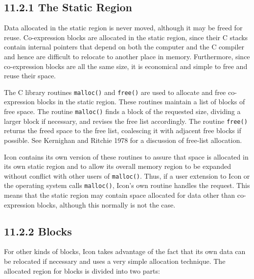 \subsection[11.2.1 The Static Region]{11.2.1 The Static Region}

Data allocated in the static region is never moved, although it may be
freed for reuse. Co-expression blocks are allocated in the static
region, since their C stacks contain internal pointers that depend on
both the computer and the C compiler and hence are difficult to
relocate to another place in memory. Furthermore, since co-expression
blocks are all the same size, it is economical and simple to free and
reuse their space.

The C library routines \texttt{malloc()} and \texttt{free()} are used
to allocate and free co-expression blocks in the static region. These
routines maintain a list of blocks of free space. The routine
\texttt{malloc()} finds a block of the requested size, dividing a
larger block if necessary, and revises the free list accordingly. The
routine \texttt{free()} returns the freed space to the free list,
coalescing it with adjacent free blocks if possible. See Kernighan and
Ritchie 1978 for a discussion of free-list allocation.

Icon contains its own version of these routines to assure that space
is allocated in its own static region and to allow its overall memory
region to be expanded without conflict with other users of
\texttt{malloc()}. Thus, if a user extension to Icon or the operating
system calls \texttt{malloc()}, Icon's own routine handles the
request. This means that the static region may contain space allocated
for data other than co-expression blocks, although this normally is
not the case.

\subsection[11.2.2 Blocks]{11.2.2 Blocks}

For other kinds of blocks, Icon takes advantage of the fact that its
own data can be relocated if necessary and uses a very simple
allocation technique. The allocated region for blocks is divided into
two parts:

